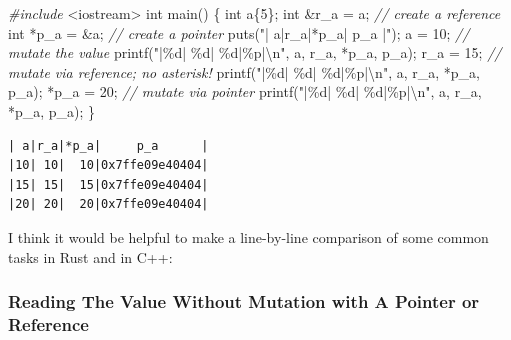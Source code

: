 \documentclass[
]{book}
\newenvironment{Shaded}{\begin{snugshade}}{\end{snugshade}}
\newcommand{\CommentTok}[1]{\textcolor[rgb]{0.56,0.35,0.01}{\textit{#1}}}
\newcommand{\DataTypeTok}[1]{\textcolor[rgb]{0.13,0.29,0.53}{#1}}
\newcommand{\DecValTok}[1]{\textcolor[rgb]{0.00,0.00,0.81}{#1}}
\newcommand{\ImportTok}[1]{#1}
\newcommand{\NormalTok}[1]{#1}
\newcommand{\PreprocessorTok}[1]{\textcolor[rgb]{0.56,0.35,0.01}{\textit{#1}}}
\newcommand{\SpecialCharTok}[1]{\textcolor[rgb]{0.00,0.00,0.00}{#1}}
\newcommand{\StringTok}[1]{\textcolor[rgb]{0.31,0.60,0.02}{#1}}
\begin{document}
\begin{Shaded}
\begin{Highlighting}[]
\PreprocessorTok{\#include }\ImportTok{\textless{}iostream\textgreater{}}
\DataTypeTok{int}\NormalTok{ main()}
\NormalTok{\{}
    \DataTypeTok{int}\NormalTok{ a\{}\DecValTok{5}\NormalTok{\};}
    \DataTypeTok{int}\NormalTok{ \&r\_a = a;  }\CommentTok{// create a reference}
    \DataTypeTok{int}\NormalTok{ *p\_a = \&a; }\CommentTok{// create a pointer}
\NormalTok{    puts(}\StringTok{"| a|r\_a|*p\_a|     p\_a      |"}\NormalTok{);}
\NormalTok{    a = }\DecValTok{10}\NormalTok{; }\CommentTok{// mutate the value}
\NormalTok{    printf(}\StringTok{"|}\SpecialCharTok{\%d}\StringTok{| }\SpecialCharTok{\%d}\StringTok{|  }\SpecialCharTok{\%d}\StringTok{|}\SpecialCharTok{\%p}\StringTok{|}\SpecialCharTok{\textbackslash{}n}\StringTok{"}\NormalTok{, a, r\_a, *p\_a, p\_a);}
\NormalTok{    r\_a = }\DecValTok{15}\NormalTok{; }\CommentTok{// mutate via reference; no asterisk!}
\NormalTok{    printf(}\StringTok{"|}\SpecialCharTok{\%d}\StringTok{| }\SpecialCharTok{\%d}\StringTok{|  }\SpecialCharTok{\%d}\StringTok{|}\SpecialCharTok{\%p}\StringTok{|}\SpecialCharTok{\textbackslash{}n}\StringTok{"}\NormalTok{, a, r\_a, *p\_a, p\_a);}
\NormalTok{    *p\_a = }\DecValTok{20}\NormalTok{; }\CommentTok{// mutate via pointer}
\NormalTok{    printf(}\StringTok{"|}\SpecialCharTok{\%d}\StringTok{| }\SpecialCharTok{\%d}\StringTok{|  }\SpecialCharTok{\%d}\StringTok{|}\SpecialCharTok{\%p}\StringTok{|}\SpecialCharTok{\textbackslash{}n}\StringTok{"}\NormalTok{, a, r\_a, *p\_a, p\_a);}
\NormalTok{\}}
\end{Highlighting}
\end{Shaded}

\begin{verbatim}
| a|r_a|*p_a|     p_a      |
|10| 10|  10|0x7ffe09e40404|
|15| 15|  15|0x7ffe09e40404|
|20| 20|  20|0x7ffe09e40404|
\end{verbatim}

I think it would be helpful to make a line-by-line comparison of some common tasks in Rust and in C++:

\hypertarget{reading-the-value-without-mutation-with-a-pointer-or-reference}{%
\subsubsection{Reading The Value Without Mutation with A Pointer or Reference}\label{reading-the-value-without-mutation-with-a-pointer-or-reference}}
\end{document}
